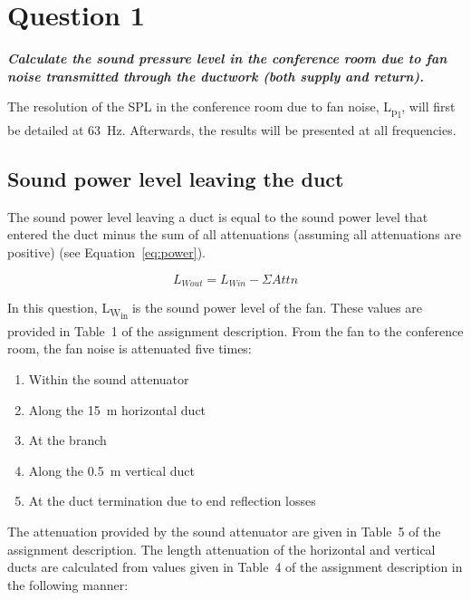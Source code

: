 \section{Question 1}

\textbf{\textit{Calculate the sound pressure level in the conference room due to fan noise transmitted through the ductwork (both supply and return).}}


The resolution of the SPL in the conference room due to fan noise, L\textsubscript{p\textsubscript{1}}, will first be detailed at 63~Hz.
Afterwards, the results will be presented at all frequencies.


\subsection{Sound power level leaving the duct}

The sound power level leaving a duct is equal to the sound power level that entered the duct minus the sum of all attenuations (assuming all attenuations are positive) (see Equation~\ref{eq:power}).

    \begin{equation}\label{eq:power}
		L_{W out} = L_{W in} - \Sigma Attn
	\end{equation}
	
In this question, L\textsubscript{W\textsubscript{in}} is the sound power level of the fan.
These values are provided in Table~1 of the assignment description.
From the fan to the conference room, the fan noise is attenuated five times:
\begin{enumerate}
	\item Within the sound attenuator
	\item Along the 15~m horizontal duct
	\item At the branch
	\item Along the 0.5~m vertical duct
	\item At the duct termination due to end reflection losses
\end{enumerate}

The attenuation provided by the sound attenuator are given in Table~5 of the assignment description.
The length attenuation of the horizontal and vertical ducts are calculated from values given in Table~4 of the assignment description in the following manner: 